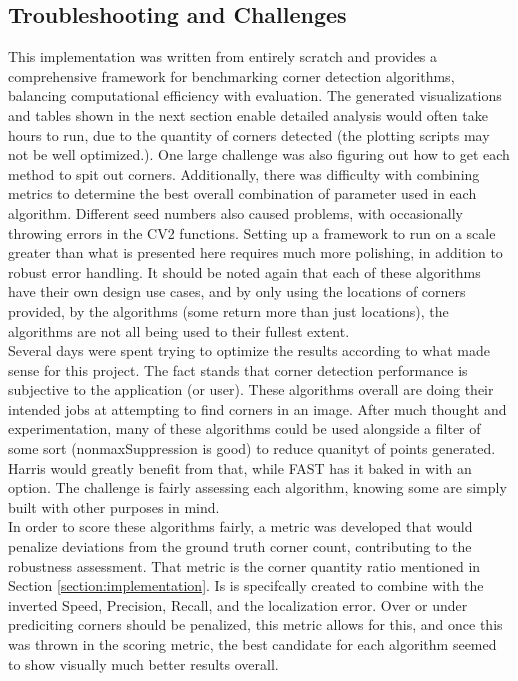 \documentclass[journal]{IEEEtran}
\begin{document}
\subsection{Troubleshooting and Challenges}
This implementation was written from entirely scratch and provides a comprehensive framework for benchmarking corner detection algorithms, balancing computational efficiency with evaluation. The generated visualizations and tables shown in the next section enable detailed analysis would often take hours to run, due to the quantity of corners detected (the plotting scripts may not be well optimized.). One large challenge was also figuring out how to get each method to spit out corners. Additionally, there was difficulty with combining metrics to determine the best overall combination of parameter used in each algorithm. Different seed numbers also caused problems, with occasionally throwing errors in the CV2 functions. Setting up a framework to run on a scale greater than what is presented here requires much more polishing, in addition to robust error handling. It should be noted again that each of these algorithms have their own design use cases, and by only using the locations of corners provided, by the algorithms (some return more than just locations), the algorithms are not all being used to their fullest extent.\\

Several days were spent trying to optimize the results according to what made sense for this project. The fact stands that corner detection performance is subjective to the application (or user). These algorithms overall are doing their intended jobs at attempting to find corners in an image. After much thought and experimentation, many of these algorithms could be used alongside a filter of some sort (nonmaxSuppression is good) to reduce quanityt of points generated. Harris would greatly benefit from that, while FAST has it baked in with an option. The challenge is fairly assessing each algorithm, knowing some are simply built with other purposes in mind.\\

In order to score these algorithms fairly, a metric was developed that would penalize deviations from the ground truth corner count, contributing to the robustness assessment. That metric is the corner quantity ratio mentioned in Section \ref{section:implementation}. Is is specifcally created to combine with the inverted Speed, Precision, Recall, and the localization error. Over or under prediciting corners should be penalized, this metric allows for this, and once this was thrown in the scoring metric, the best candidate for each algorithm seemed to show visually much better results overall.
\end{document}
